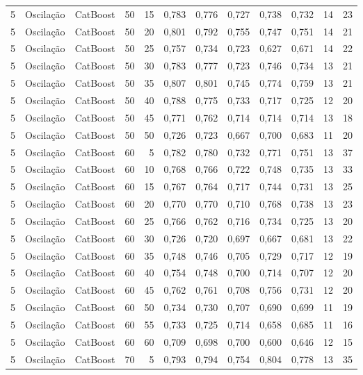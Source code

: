 \begin{longtable}{@{}rllrrrrrrrrr@{}}
5 & Oscilação & CatBoost & 50 & 15 & 0,783 & 0,776 & 0,727 & 0,738 & 0,732 & 14 & 23 \\
5 & Oscilação & CatBoost & 50 & 20 & 0,801 & 0,792 & 0,755 & 0,747 & 0,751 & 14 & 21 \\
5 & Oscilação & CatBoost & 50 & 25 & 0,757 & 0,734 & 0,723 & 0,627 & 0,671 & 14 & 22 \\
5 & Oscilação & CatBoost & 50 & 30 & 0,783 & 0,777 & 0,723 & 0,746 & 0,734 & 13 & 21 \\
5 & Oscilação & CatBoost & 50 & 35 & 0,807 & 0,801 & 0,745 & 0,774 & 0,759 & 13 & 21 \\
5 & Oscilação & CatBoost & 50 & 40 & 0,788 & 0,775 & 0,733 & 0,717 & 0,725 & 12 & 20 \\
5 & Oscilação & CatBoost & 50 & 45 & 0,771 & 0,762 & 0,714 & 0,714 & 0,714 & 13 & 18 \\
5 & Oscilação & CatBoost & 50 & 50 & 0,726 & 0,723 & 0,667 & 0,700 & 0,683 & 11 & 20 \\
5 & Oscilação & CatBoost & 60 & 5 & 0,782 & 0,780 & 0,732 & 0,771 & 0,751 & 13 & 37 \\
5 & Oscilação & CatBoost & 60 & 10 & 0,768 & 0,766 & 0,722 & 0,748 & 0,735 & 13 & 33 \\
5 & Oscilação & CatBoost & 60 & 15 & 0,767 & 0,764 & 0,717 & 0,744 & 0,731 & 13 & 25 \\
5 & Oscilação & CatBoost & 60 & 20 & 0,770 & 0,770 & 0,710 & 0,768 & 0,738 & 13 & 23 \\
5 & Oscilação & CatBoost & 60 & 25 & 0,766 & 0,762 & 0,716 & 0,734 & 0,725 & 13 & 20 \\
5 & Oscilação & CatBoost & 60 & 30 & 0,726 & 0,720 & 0,697 & 0,667 & 0,681 & 13 & 22 \\
5 & Oscilação & CatBoost & 60 & 35 & 0,748 & 0,746 & 0,705 & 0,729 & 0,717 & 12 & 19 \\
5 & Oscilação & CatBoost & 60 & 40 & 0,754 & 0,748 & 0,700 & 0,714 & 0,707 & 12 & 20 \\
5 & Oscilação & CatBoost & 60 & 45 & 0,762 & 0,761 & 0,708 & 0,756 & 0,731 & 12 & 20 \\
5 & Oscilação & CatBoost & 60 & 50 & 0,734 & 0,730 & 0,707 & 0,690 & 0,699 & 11 & 19 \\
5 & Oscilação & CatBoost & 60 & 55 & 0,733 & 0,725 & 0,714 & 0,658 & 0,685 & 11 & 16 \\
5 & Oscilação & CatBoost & 60 & 60 & 0,709 & 0,698 & 0,700 & 0,600 & 0,646 & 12 & 15 \\
5 & Oscilação & CatBoost & 70 & 5 & 0,793 & 0,794 & 0,754 & 0,804 & 0,778 & 13 & 35 \\

\end{longtable}
